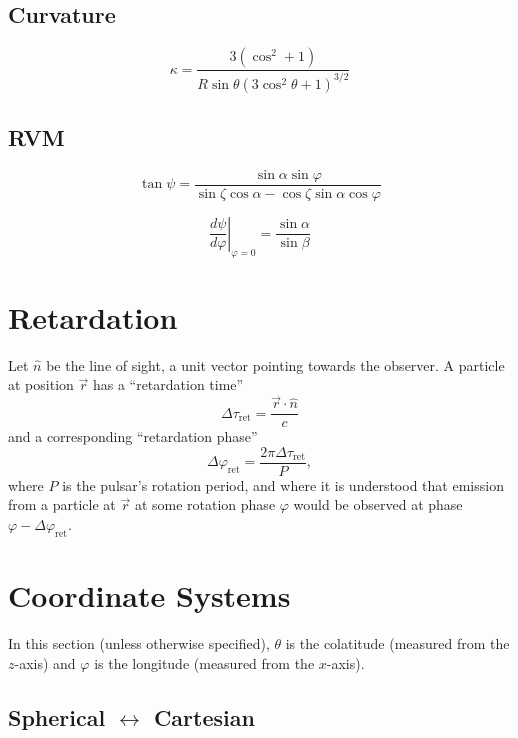 \documentclass[twocolumn]{article}
\newcommand{\phase}{\varphi}
\begin{document}
\subsection{Curvature}

\begin{equation}
    \kappa = \frac{3(\cos^2 + 1)}{R\sin\theta(3\cos^2\theta + 1)^{3/2}}
\end{equation}

\subsection{RVM}

\begin{equation}
    \tan{\psi} = \frac{\sin\alpha \sin\phase}{\sin\zeta\cos\alpha - \cos\zeta\sin\alpha\cos\phase}
\end{equation}

\begin{equation}
    \left.\frac{d\psi}{d\phase}\right|_{\phase=0} = \frac{\sin\alpha}{\sin\beta}
\end{equation}

\section{Retardation}

Let $\hat{n}$ be the line of sight, a unit vector pointing towards the observer.
A particle at position $\vec{r}$ has a ``retardation time''
\begin{equation}
    \Delta\tau_\text{ret} = \frac{\vec{r}\cdot\hat{n}}{c}
\end{equation}
and a corresponding ``retardation phase''
\begin{equation}
    \Delta\phase_\text{ret} = \frac{2\pi\Delta\tau_\text{ret}}{P},
\end{equation}
where $P$ is the pulsar's rotation period, and where it is understood that emission from a particle at $\vec{r}$ at some rotation phase $\phase$ would be observed at phase $\phase - \Delta\phase_\text{ret}$.

\section{Coordinate Systems}

In this section (unless otherwise specified), $\theta$ is the colatitude (measured from the $z$-axis) and $\phase$ is the longitude (measured from the $x$-axis).

\subsection{Spherical $\leftrightarrow$ Cartesian}
\end{document}
